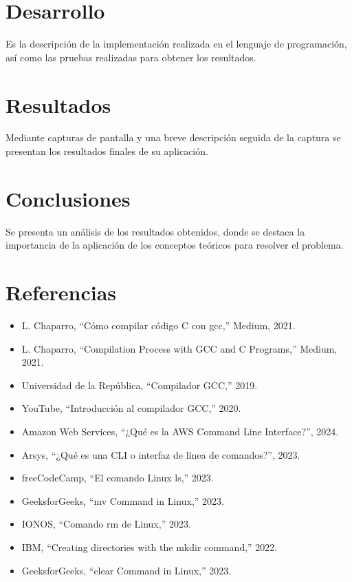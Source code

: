 \documentclass[letterpaper,12pt,oneside]{article}
\begin{document}
\section{Desarrollo}

Es la descripción de la implementación realizada en el lenguaje de programación, así como las pruebas realizadas para obtener los resultados.

\section{Resultados}

Mediante capturas de pantalla y una breve descripción seguida de la captura se presentan los resultados finales de su aplicación.

\section{Conclusiones}

Se presenta un análisis de los resultados obtenidos, donde se destaca la importancia de la aplicación de los conceptos teóricos para resolver el problema.

\clearpage
\section*{Referencias}

\begin{itemize}
    \item [1] L. Chaparro, “Cómo compilar código C con gcc,” Medium, 2021.
    \item [2] L. Chaparro, “Compilation Process with GCC and C Programs,” Medium, 2021.
    \item [3] Universidad de la República, “Compilador GCC,” 2019.
    \item [4] YouTube, “Introducción al compilador GCC,” 2020.
    \item [5] Amazon Web Services, “¿Qué es la AWS Command Line Interface?”, 2024.
    \item [6] Arsys, “¿Qué es una CLI o interfaz de línea de comandos?”, 2023.
    \item [7] freeCodeCamp, “El comando Linux ls,” 2023.
    \item [8] GeeksforGeeks, “mv Command in Linux,” 2023.
    \item [9] IONOS, “Comando rm de Linux,” 2023.
    \item [10] IBM, “Creating directories with the mkdir command,” 2022.
    \item [11] GeeksforGeeks, “clear Command in Linux,” 2023.
\end{itemize}
\end{document}
